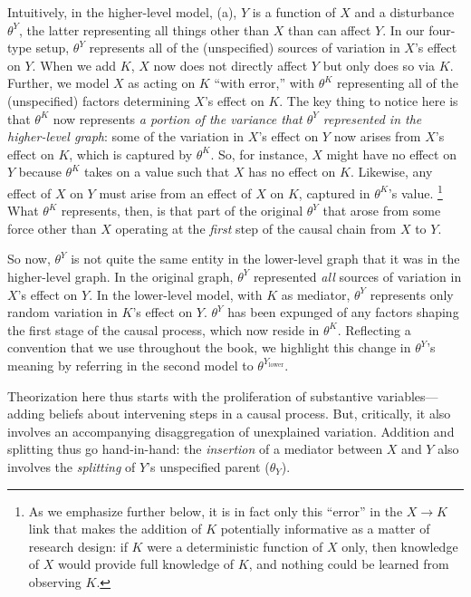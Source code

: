 \documentclass[
  12pt,
]{book}
\begin{document}
Intuitively, in the higher-level model, (a), \(Y\) is a function of \(X\) and a disturbance \(\theta^Y\), the latter representing all things other than \(X\) than can affect \(Y\). In our four-type setup, \(\theta^Y\) represents all of the (unspecified) sources of variation in \(X\)'s effect on \(Y\). When we add \(K\), \(X\) now does not directly affect \(Y\) but only does so via \(K\). Further, we model \(X\) as acting on \(K\) ``with error,'' with \(\theta^K\) representing all of the (unspecified) factors determining \(X\)'s effect on \(K\). The key thing to notice here is that \(\theta^K\) now represents \emph{a portion of the variance that \(\theta^Y\) represented in the higher-level graph}: some of the variation in \(X\)'s effect on \(Y\) now arises from \(X\)'s effect on \(K\), which is captured by \(\theta^K\). So, for instance, \(X\) might have no effect on \(Y\) because \(\theta^K\) takes on a value such that \(X\) has no effect on \(K\). Likewise, any effect of \(X\) on \(Y\) must arise from an effect of \(X\) on \(K\), captured in \(\theta^K\)'s value. \footnote{As we emphasize further below, it is in fact only this ``error'' in the \(X\rightarrow K\) link that makes the addition of \(K\) potentially informative as a matter of research design: if \(K\) were a deterministic function of \(X\) only, then knowledge of \(X\) would provide full knowledge of \(K\), and nothing could be learned from observing \(K\).} What \(\theta^K\) represents, then, is that part of the original \(\theta^Y\) that arose from some force other than \(X\) operating at the \emph{first} step of the causal chain from \(X\) to \(Y\).

So now, \(\theta^Y\) is not quite the same entity in the lower-level graph that it was in the higher-level graph. In the original graph, \(\theta^Y\) represented \emph{all} sources of variation in \(X\)'s effect on \(Y\). In the lower-level model, with \(K\) as mediator, \(\theta^Y\) represents only random variation in \(K\)'s effect on \(Y\). \(\theta^Y\) has been expunged of any factors shaping the first stage of the causal process, which now reside in \(\theta^K\). Reflecting a convention that we use throughout the book, we highlight this change in \(\theta^Y\)'s meaning by referring in the second model to \(\theta^{Y_\text{lower}}\).

Theorization here thus starts with the proliferation of substantive variables---adding beliefs about intervening steps in a causal process. But, critically, it also involves an accompanying disaggregation of unexplained variation. Addition and splitting thus go hand-in-hand: the \emph{insertion} of a mediator between \(X\) and \(Y\) also involves the \emph{splitting} of \(Y\)'s unspecified parent (\(\theta_Y\)).
\end{document}
